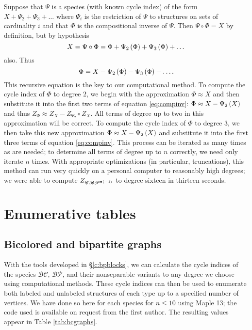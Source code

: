 \documentclass[sectionflow,singlespace,twoside,boldmathhdr]{brandiss} %
\numberwithin{section}{chapter}
\numberwithin{figure}{chapter}
\begin{document}
Suppose that $\Psi$ is a species (with known cycle index) of the form $X + \Psi_{2} + \Psi_{3} + \dots$ where $\Psi_{i}$ is the restriction of $\Psi$ to structures on sets of cardinality $i$ and that $\Phi$ is the compositional inverse of $\Psi$.
Then $\Psi \circ \Phi = X$ by definition, but by hypothesis
\begin{equation*}
  X = \Psi \circ \Phi = \Phi + \Psi_{2} \left( {\Phi} \right) + \Psi_{3} \left( {\Phi} \right) + \dots
\end{equation*}
also. Thus
\begin{equation}
  \label{eq:compinv}
  \Phi = X - \Psi_{2} \left( {\Phi} \right) - \Psi_{3} \left( {\Phi} \right) - \dots.
\end{equation}
This recursive equation is the key to our computational method.
To compute the cycle index of $\Phi$ to degree $2$, we begin with the approximation $\Phi \approx X$ and then substitute it into the first two terms of equation \eqref{eq:compinv}: $\Phi \approx X - \Psi_{2} \left( {X} \right)$ and thus $Z_{\Phi} \approx Z_{X} - Z_{\Psi_{2}} \circ Z_{X}$.
All terms of degree up to two in this approximation will be correct.
To compute the cycle index of $\Phi$ to degree $3$, we then take this new approximation $\Phi \approx X - \Psi_{2} \left( {X} \right)$ and substitute it into the first three terms of equation \eqref{eq:compinv}.
This process can be iterated as many times as are needed; to determine all terms of degree up to $n$ correctly, we need only iterate $n$ times.
With appropriate optimizations (in particular, truncations), this method can run very quickly on a personal computer to reasonably high degrees; we were able to compute $Z_{\mathscr{CBP}^{\bullet \left\langle {-1} \right\rangle}}$ to degree sixteen in thirteen seconds.

\chapter{Enumerative tables}\label{c:enum}
\section{Bicolored and bipartite graphs}\label{s:bpenum}
With the tools developed in \S \ref{c:bpblocks}, we can calculate the cycle indices of the species $\mathcal{BC}$, $\mathcal{BP}$, and their nonseparable variants to any degree we choose using computational methods.
These cycle indices can then be used to enumerate both labeled and unlabeled structures of each type up to a specified number of vertices.
We have done so here for each species for $n \leq 10$ using Maple 13; the code used is available on request from the first author.
The resulting values appear in Table \ref{tab:bcgraphs}.
\end{document}
